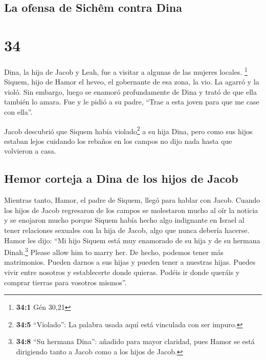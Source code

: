 \hypertarget{la-ofensa-de-sichuxeam-contra-dina}{%
\subsection{La ofensa de Sichêm contra
Dina}\label{la-ofensa-de-sichuxeam-contra-dina}}

\hypertarget{section-33}{%
\section{34}\label{section-33}}

 Dina, la hija de Jacob y Leah, fue a visitar a algunas de
las mujeres locales. \footnote{\textbf{34:1} Gén 30,21} 
Siquem, hijo de Hamor el heveo, el gobernante de esa zona, la vio. La
agarró y la violó.  Sin embargo, luego se enamoró
profundamente de Dina y trató de que ella también lo amara.
 Fue y le pidió a su padre, ``Trae a esta joven para que
me case con ella''.

 Jacob descubrió que Siquem había violado\footnote{\textbf{34:5}
  ``Violado'': La palabra usada aquí está vinculada con ser impuro.} a
su hija Dina, pero como sus hijos estaban lejos cuidando los rebaños en
los campos no dijo nada hasta que volvieron a casa.

\hypertarget{hemor-corteja-a-dina-de-los-hijos-de-jacob}{%
\subsection{Hemor corteja a Dina de los hijos de
Jacob}\label{hemor-corteja-a-dina-de-los-hijos-de-jacob}}

 Mientras tanto, Hamor, el padre de Siquem, llegó para
hablar con Jacob.  Cuando los hijos de Jacob regresaron de
los campos se molestaron mucho al oír la noticia y se enojaron mucho
porque Siquem había hecho algo indignante en Israel al tener relaciones
sexuales con la hija de Jacob, algo que nunca debería hacerse.
 Hamor les dijo: ``Mi hijo Siquem está muy enamorado de su
hija y de su hermana Dinah.\footnote{\textbf{34:8} ``Su hermana Dina'':
  añadido para mayor claridad, pues Hamor se está dirigiendo tanto a
  Jacob como a los hijos de Jacob.} Please allow him to marry her.
 De hecho, podemos tener más matrimonios. Pueden darnos a
sus hijas y pueden tener a nuestras hijas.  Puedes vivir
entre nosotros y establecerte donde quieras. Podéis ir donde queráis y
comprar tierras para vosotros mismos''.

